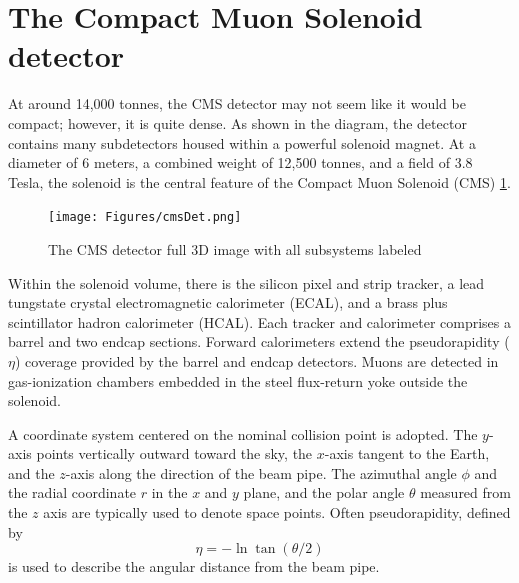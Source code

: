 \section{The Compact Muon Solenoid detector}
At around 14,000 tonnes, the CMS detector may not seem like it would be compact; however, it is quite dense. 
As shown in the diagram, the detector contains many subdetectors housed within a powerful solenoid magnet. At a diameter of 6 meters, a combined weight of 12,500 tonnes, and a field of 3.8 Tesla, the solenoid is the central feature of the Compact Muon Solenoid (CMS) \ref{fig:cmsdet}.
\begin{figure}[!htb]
\begin{center}
\texttt{[image: Figures/cmsDet.png]}
\caption{\label{fig:cmsdet}The CMS detector full 3D image with all subsystems labeled}
\end{center}
\end{figure}
 Within the solenoid volume, there is the
silicon pixel and strip tracker, a lead tungstate crystal 
electromagnetic calorimeter (ECAL), and a brass plus scintillator 
hadron calorimeter (HCAL). Each tracker and calorimeter comprises a barrel and two endcap 
sections. Forward calorimeters extend the pseudorapidity ($\eta$)
coverage provided by the barrel and endcap detectors. 
Muons are detected in gas-ionization chambers embedded 
in the steel flux-return yoke outside the solenoid.

A coordinate system centered on the nominal collision point is adopted. 
The $y$-axis points vertically outward toward the sky, the $x$-axis tangent to the Earth, and the $z$-axis along the direction of the beam pipe. The azimuthal angle $\phi$ and the radial coordinate $r$ in the $x$ and $y$ plane, and the polar angle $\theta$ measured from the $z$ axis are typically used to denote space points. 
Often pseudorapidity, defined by
\begin{equation}\eta = - \ln \tan(\theta/2)\end{equation}  
 is used to describe the angular distance from the beam pipe. 




